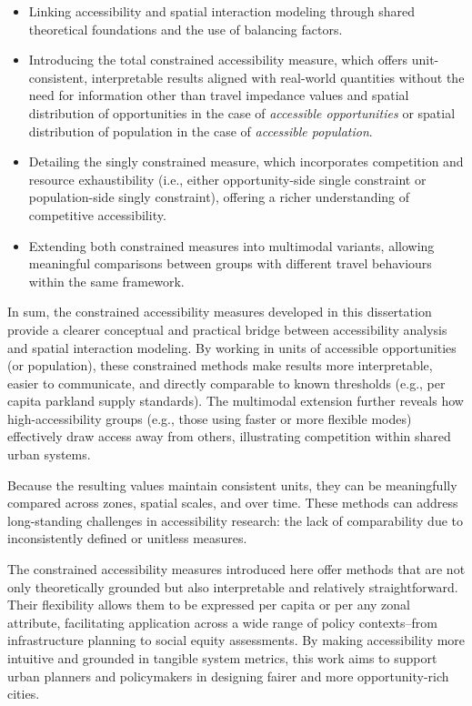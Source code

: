 \documentclass[
11pt, %
oneside, %
english, %
singlespacing, %
]{macthesis} %
\def\tightlist{}
\begin{document}
\begin{itemize}
\tightlist
\item
  Linking accessibility and spatial interaction modeling through shared theoretical foundations and the use of balancing factors.
\item
  Introducing the total constrained accessibility measure, which offers unit-consistent, interpretable results aligned with real-world quantities without the need for information other than travel impedance values and spatial distribution of opportunities in the case of \emph{accessible opportunities} or spatial distribution of population in the case of \emph{accessible population}.
\item
  Detailing the singly constrained measure, which incorporates competition and resource exhaustibility (i.e., either opportunity-side single constraint or population-side singly constraint), offering a richer understanding of competitive accessibility.
\item
  Extending both constrained measures into multimodal variants, allowing meaningful comparisons between groups with different travel behaviours within the same framework.
\end{itemize}

In sum, the constrained accessibility measures developed in this dissertation provide a clearer conceptual and practical bridge between accessibility analysis and spatial interaction modeling. By working in units of accessible opportunities (or population), these constrained methods make results more interpretable, easier to communicate, and directly comparable to known thresholds (e.g., per capita parkland supply standards). The multimodal extension further reveals how high-accessibility groups (e.g., those using faster or more flexible modes) effectively draw access away from others, illustrating competition within shared urban systems.

Because the resulting values maintain consistent units, they can be meaningfully compared across zones, spatial scales, and over time. These methods can address long-standing challenges in accessibility research: the lack of comparability due to inconsistently defined or unitless measures.

The constrained accessibility measures introduced here offer methods that are not only theoretically grounded but also interpretable and relatively straightforward. Their flexibility allows them to be expressed per capita or per any zonal attribute, facilitating application across a wide range of policy contexts--from infrastructure planning to social equity assessments. By making accessibility more intuitive and grounded in tangible system metrics, this work aims to support urban planners and policymakers in designing fairer and more opportunity-rich cities.
\end{document}
